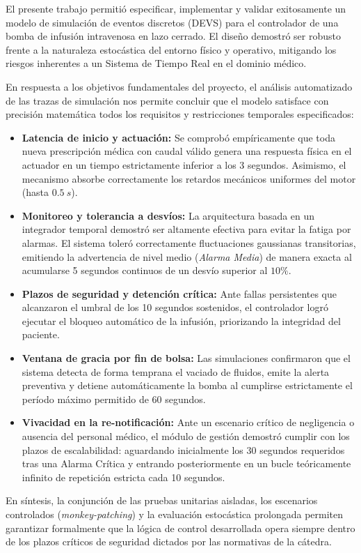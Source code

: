 El presente trabajo permitió especificar, implementar y validar exitosamente un modelo de simulación de eventos discretos (DEVS) para el controlador de una bomba de infusión intravenosa en lazo cerrado. El diseño demostró ser robusto frente a la naturaleza estocástica del entorno físico y operativo, mitigando los riesgos inherentes a un Sistema de Tiempo Real en el dominio médico.

En respuesta a los objetivos fundamentales del proyecto, el análisis automatizado de las trazas de simulación nos permite concluir que el modelo satisface con precisión matemática todos los requisitos y restricciones temporales especificados:

\begin{itemize}
    \item \textbf{Latencia de inicio y actuación:} Se comprobó empíricamente que toda nueva prescripción médica con caudal válido genera una respuesta física en el actuador en un tiempo estrictamente inferior a los 3 segundos. Asimismo, el mecanismo absorbe correctamente los retardos mecánicos uniformes del motor (hasta $0.5~s$).
    
    \item \textbf{Monitoreo y tolerancia a desvíos:} La arquitectura basada en un integrador temporal demostró ser altamente efectiva para evitar la fatiga por alarmas. El sistema toleró correctamente fluctuaciones gaussianas transitorias, emitiendo la advertencia de nivel medio (\textit{Alarma Media}) de manera exacta al acumularse 5 segundos continuos de un desvío superior al $10\%$.
    
    \item \textbf{Plazos de seguridad y detención crítica:} Ante fallas persistentes que alcanzaron el umbral de los 10 segundos sostenidos, el controlador logró ejecutar el bloqueo automático de la infusión, priorizando la integridad del paciente.
    
    \item \textbf{Ventana de gracia por fin de bolsa:} Las simulaciones confirmaron que el sistema detecta de forma temprana el vaciado de fluidos, emite la alerta preventiva y detiene automáticamente la bomba al cumplirse estrictamente el período máximo permitido de 60 segundos.
    
    \item \textbf{Vivacidad en la re-notificación:} Ante un escenario crítico de negligencia o ausencia del personal médico, el módulo de gestión demostró cumplir con los plazos de escalabilidad: aguardando inicialmente los 30 segundos requeridos tras una Alarma Crítica y entrando posteriormente en un bucle teóricamente infinito de repetición estricta cada 10 segundos.
\end{itemize}

En síntesis, la conjunción de las pruebas unitarias aisladas, los escenarios controlados (\textit{monkey-patching}) y la evaluación estocástica prolongada permiten garantizar formalmente que la lógica de control desarrollada opera siempre dentro de los plazos críticos de seguridad dictados por las normativas de la cátedra.